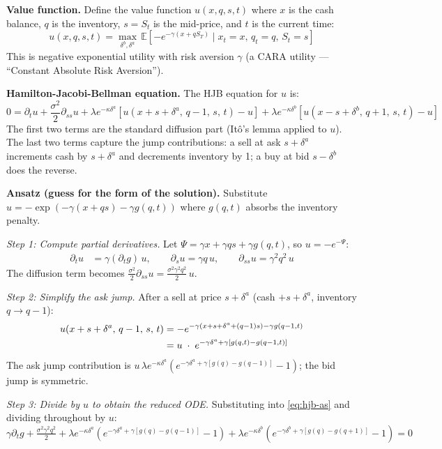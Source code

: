 \documentclass[12pt,a4paper,openany]{report}
\theoremstyle{definition}
\newcommand{\E}{\mathbb{E}}
\begin{document}
\textbf{Value function.} Define the value function $u(x, q, s, t)$ where $x$ is the cash balance, $q$ is the inventory, $s = S_t$ is the mid-price, and $t$ is the current time:
\[
  u(x, q, s, t) = \max_{\delta^b, \delta^a}\, \E\!\left[-e^{-\gamma(x + qS_T)} \mid x_t = x,\, q_t = q,\, S_t = s\right]
\]
This is negative exponential utility with risk aversion $\gamma$ (a CARA utility — ``Constant Absolute Risk Aversion'').

\textbf{Hamilton-Jacobi-Bellman equation.} The HJB equation for $u$ is:
\begin{equation}
  0 = \partial_t u + \frac{\sigma^2}{2}\partial_{ss} u + \lambda e^{-\kappa\delta^a}\left[u(x+s+\delta^a,\, q-1,\, s,\, t) - u\right]
  + \lambda e^{-\kappa\delta^b}\left[u(x-s+\delta^b,\, q+1,\, s,\, t) - u\right]
  \label{eq:hjb-as}
\end{equation}
The first two terms are the standard diffusion part (Itô's lemma applied to $u$). The last two terms capture the jump contributions: a sell at ask $s + \delta^a$ increments cash by $s + \delta^a$ and decrements inventory by 1; a buy at bid $s - \delta^b$ does the reverse.

\textbf{Ansatz (guess for the form of the solution).} Substitute $u = -\exp(-\gamma(x + qs) - \gamma g(q, t))$ where $g(q,t)$ absorbs the inventory penalty.

\textit{Step 1: Compute partial derivatives.} Let $\Psi = \gamma x + \gamma qs + \gamma g(q,t)$, so $u = -e^{-\Psi}$:
\begin{align}
  \partial_t u &= \gamma(\partial_t g)\, u, \qquad
  \partial_s u = \gamma q\, u, \qquad
  \partial_{ss} u = \gamma^2 q^2\, u
\end{align}
The diffusion term becomes $\tfrac{\sigma^2}{2}\partial_{ss} u = \tfrac{\sigma^2\gamma^2 q^2}{2}\, u$.

\textit{Step 2: Simplify the ask jump.} After a sell at price $s+\delta^a$ (cash $+s+\delta^a$, inventory $q \to q-1$):
\begin{align}
  u(x+s+\delta^a,\, q-1,\, s,\, t)
  &= -e^{-\gamma(x+s+\delta^a+(q-1)s)-\gamma g(q-1,t)} \notag \\
  &= u\;\cdot\; e^{-\gamma\delta^a + \gamma[g(q,t)-g(q-1,t)]}
\end{align}
The ask jump contribution is $u\,\lambda e^{-\kappa\delta^a}\!\left(e^{-\gamma\delta^a+\gamma[g(q)-g(q-1)]} - 1\right)$; the bid jump is symmetric.

\textit{Step 3: Divide by $u$ to obtain the reduced ODE.} Substituting into \eqref{eq:hjb-as} and dividing throughout by $u$:
\begin{equation}
  \gamma\partial_t g + \tfrac{\sigma^2\gamma^2 q^2}{2}
  + \lambda e^{-\kappa\delta^a}\!\left(e^{-\gamma\delta^a+\gamma[g(q)-g(q-1)]}-1\right)
  + \lambda e^{-\kappa\delta^b}\!\left(e^{-\gamma\delta^b+\gamma[g(q)-g(q+1)]}-1\right)
  = 0
  \label{eq:hjb-reduced}
\end{equation}
\end{document}
